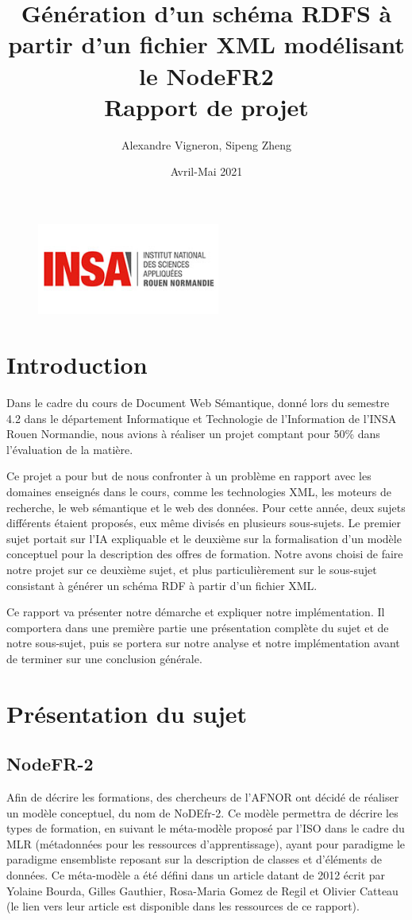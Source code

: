 \documentclass{article}
\title{Génération d'un schéma RDFS à partir d'un fichier XML modélisant le NodeFR2\\Rapport de projet}
\author{Alexandre Vigneron, Sipeng Zheng}
\date{Avril-Mai 2021}
\begin{document}
\maketitle
\begin{figure}[!ht]
    \center
    \includegraphics[width=6cm, height=3cm]{img/logo}
\end{figure}
\tableofcontents
\newpage

\section{Introduction}
Dans le cadre du cours de Document Web Sémantique, donné lors du semestre 4.2 dans le département Informatique et Technologie de l'Information de l'INSA Rouen Normandie, nous avions à réaliser un projet comptant pour 50\% dans l'évaluation de la matière. 

Ce projet a pour but de nous confronter à un problème en rapport avec les domaines enseignés dans le cours, comme les technologies XML, les moteurs de recherche, le web sémantique et le web des données.
Pour cette année, deux sujets différents étaient proposés, eux même divisés en plusieurs sous-sujets. Le premier sujet portait sur l'IA expliquable et le deuxième sur la formalisation d'un modèle conceptuel pour la description des offres de formation. Notre avons choisi de faire notre projet sur ce deuxième sujet, et plus particulièrement sur le sous-sujet consistant à générer un schéma RDF à partir d'un fichier XML.

Ce rapport va présenter notre démarche et expliquer notre implémentation. Il comportera dans une première partie une présentation complète du sujet et de notre sous-sujet, puis se portera sur notre analyse et notre implémentation avant de terminer sur une conclusion générale.

\section{Présentation du sujet}
\subsection{NodeFR-2}
Afin de décrire les formations, des chercheurs de l'AFNOR ont décidé de réaliser un modèle conceptuel, du nom de NoDEfr-2. Ce modèle permettra de décrire les types de formation, en suivant le méta-modèle proposé par l'ISO dans le cadre du MLR (métadonnées pour les ressources d'apprentissage), ayant pour paradigme le paradigme ensembliste reposant sur la description de classes et d'éléments de données. Ce méta-modèle a été défini dans un article datant de 2012 écrit par Yolaine Bourda, Gilles Gauthier, Rosa-Maria Gomez de Regil et Olivier Catteau (le lien vers leur article est disponible dans les ressources de ce rapport).\\
\end{document}
